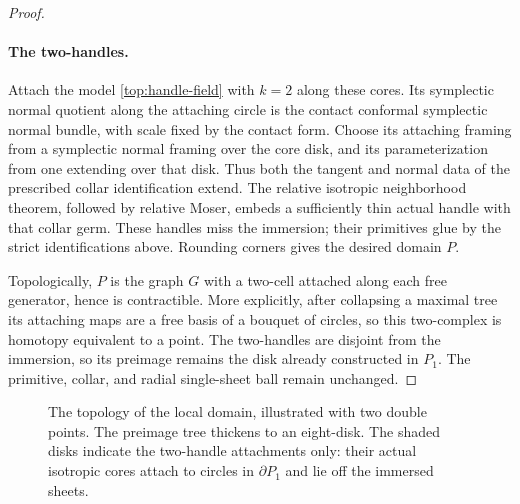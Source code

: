 \begin{proof}
\paragraph{The two-handles.}
Attach the model \eqref{top:handle-field} with $k=2$ along these
cores.  Its symplectic normal quotient along the attaching
circle is the contact conformal symplectic normal bundle,
with scale fixed by the contact form.  Choose its attaching
framing from a symplectic normal framing over the core disk,
and its parameterization from one extending over that disk.
Thus both the tangent and normal data of the prescribed collar
identification extend.  The relative isotropic neighborhood
theorem, followed by relative Moser, embeds a sufficiently thin
actual handle with that collar germ.  These handles miss the
immersion; their primitives glue by the strict identifications
above.  Rounding corners gives the desired domain $P$.

Topologically, $P$ is the graph $G$ with a two-cell attached
along each free generator, hence is contractible.  More
explicitly, after collapsing a maximal tree its attaching maps
are a free basis of a bouquet of circles, so this two-complex
is homotopy equivalent to a point.  The two-handles are
disjoint from the immersion, so its preimage remains the disk
already constructed in $P_1$.  The primitive, collar, and
radial single-sheet ball remain unchanged.
\end{proof}

\begin{figure}[tb]
\centering
{}
\caption{The topology of the local domain, illustrated with two double
points.  The preimage tree thickens to an eight-disk.  The shaded disks
indicate the two-handle attachments only: their actual isotropic cores
attach to circles in $\partial P_1$ and lie off the immersed sheets.}
\label{top:domain-figure}
\end{figure}


